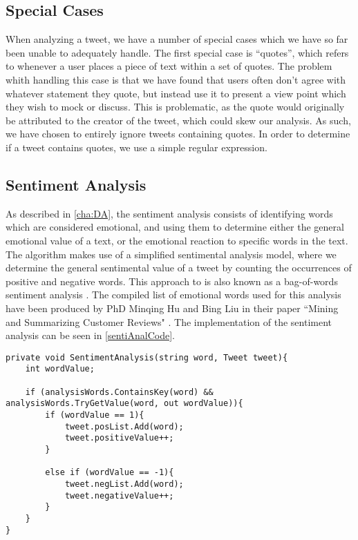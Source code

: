 \subsection{Special Cases}\label{AlgorithmCases}
When analyzing a tweet, we have a number of special cases which we have so far
been unable to adequately handle. The first special case is ``quotes'', which refers
to whenever a user places a piece of text within a set of quotes. The problem
whith handling this case is that we have found that users often don't agree
with whatever statement they quote, but instead use it to present a view point
which they wish to mock or discuss. This is problematic, as the quote would
originally be attributed to the creator of the tweet, which could skew our
analysis. As such, we have chosen to entirely ignore tweets containing quotes.
In order to determine if a tweet contains quotes, we use a simple regular
expression.

\subsection{Sentiment Analysis}
As described in \autoref{cha:DA}, the sentiment analysis consists of
identifying words which are considered emotional, and using them to determine
either the general emotional value of a text, or the emotional reaction to
specific words in the text. The algorithm makes use of a simplified sentimental
analysis model, where we determine the general sentimental value of a tweet by
counting the occurrences of positive and negative words. This approach to is
also known as a bag-of-words sentiment analysis \citep{BagOfWords}. The
compiled list of emotional words used for this analysis have been produced by
PhD Minqing Hu and Bing Liu in their paper ``Mining and Summarizing Customer
Reviews" \citep{Hu:2004:MSC:1014052.1014073}. The implementation of the
sentiment analysis can be seen in \autoref{sentiAnalCode}.\\

\begin{minipage}[H]{\linewidth}
\begin{lstlisting}[caption = Determining the sentiment of a tweet , label = sentiAnalCode] 
private void SentimentAnalysis(string word, Tweet tweet){
	int wordValue;

    if (analysisWords.ContainsKey(word) && analysisWords.TryGetValue(word, out wordValue)){
    	if (wordValue == 1){
        	tweet.posList.Add(word);
            tweet.positiveValue++;
        }

        else if (wordValue == -1){
        	tweet.negList.Add(word);
            tweet.negativeValue++;
        }
    }
}
\end{lstlisting}
\end{minipage}

